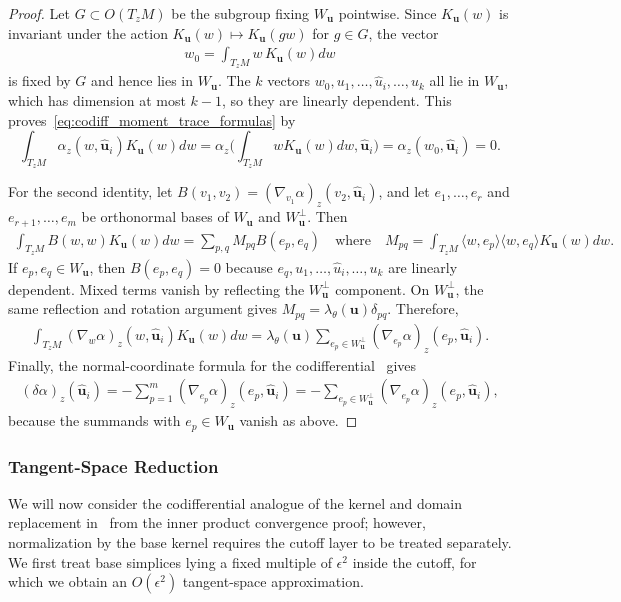 \documentclass[11pt,reqno]{amsproc}
\numberwithin{equation}{section}
\newcommand{\bu}{\mathbf{u}}
\theoremstyle{definition}
\theoremstyle{plain}
\begin{document}
\begin{proof}
    Let $G\subset O(T_zM)$ be the subgroup fixing $W_\bu$ pointwise. Since $K_\bu(w)$ is invariant under the action $K_\bu(w) \mapsto K_\bu(g w)$ for $g \in G$, the vector
    \begin{align}
        w_0=\int_{T_zM} w\,K_\bu(w)dw
    \end{align}
    is fixed by $G$ and hence lies in $W_\bu$. The $k$ vectors $w_0,u_1,\ldots,\hat u_i,\ldots,u_k$ all lie in $W_\bu$, which has dimension at most $k-1$, so they are linearly dependent. This proves~\eqref{eq:codiff_moment_trace_formulas} by 
    \begin{equation}
        \int_{T_zM} \alpha_z(w, \hat{\bu}_i)K_\bu(w)dw = \alpha_z \Big( \int_{T_zM}w K_\bu(w) dw, \hat{\bu}_i \Big) = \alpha_z(w_0,\hat{\bu}_i) = 0.
    \end{equation}
    
    For the second identity, let $B(v_1,v_2)=(\nabla_{v_1}\alpha)_z(v_2,\hat{\bu}_i)$, and let $e_1,\ldots,e_r$ and $e_{r+1},\ldots,e_m$ be orthonormal bases of $W_\bu$ and $W_\bu^\perp$. Then
    \begin{align}
        \int_{T_zM} B(w,w)K_\bu(w)dw = \sum_{p,q} M_{pq}B(e_p,e_q) \quad \text{where} \quad M_{pq}=\int_{T_zM}\langle w,e_p\rangle\langle w,e_q\rangle K_\bu(w)dw.
    \end{align}
    If $e_p,e_q\in W_\bu$, then $B(e_p,e_q)=0$ because $e_q,u_1,\ldots,\hat u_i,\ldots,u_k$ are linearly dependent. Mixed terms vanish by reflecting the $W_\bu^\perp$ component. On $W_\bu^\perp$, the same reflection and rotation argument gives $M_{pq}=\lambda_\theta(\bu)\delta_{pq}$. Therefore,
    \begin{align}
        \int_{T_zM} (\nabla_w\alpha)_z(w,\hat{\bu}_i)K_\bu(w)dw
        = \lambda_\theta(\bu)\sum_{e_p\in W_\bu^\perp}(\nabla_{e_p}\alpha)_z(e_p,\hat{\bu}_i).
    \end{align}
    Finally, the normal-coordinate formula for the codifferential~\cite[Eq. 3.3.47]{jost_riemannian_2013} gives
    \begin{align}
        (\delta\alpha)_z(\hat{\bu}_i)=-\sum_{p=1}^m(\nabla_{e_p}\alpha)_z(e_p,\hat{\bu}_i)
        =-\sum_{e_p\in W_\bu^\perp}(\nabla_{e_p}\alpha)_z(e_p,\hat{\bu}_i),
    \end{align}
    because the summands with $e_p\in W_\bu$ vanish as above.
\end{proof}

\subsubsection{Tangent-Space Reduction} \label{sssec:tangent_space_reduction}
We will now consider the codifferential analogue of the kernel and domain replacement in~ from the inner product convergence proof; however, normalization by the base kernel requires the cutoff layer to be treated separately.
We first treat base simplices lying a fixed multiple of $\epsilon^2$ inside the cutoff, for which we obtain an $O(\epsilon^2)$ tangent-space approximation.
\end{document}
